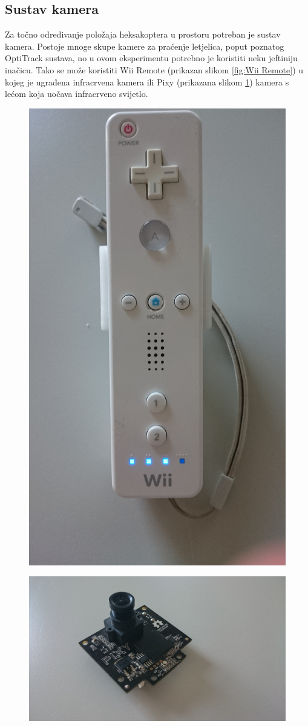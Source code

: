 \documentclass[times, utf8, diplomski]{fer}
\begin{document}
\subsection{Sustav kamera}\label{sec:kamera}
Za točno određivanje položaja heksakoptera u prostoru potreban je sustav kamera. Postoje mnoge skupe kamere za praćenje letjelica, poput poznatog OptiTrack sustava, no u ovom eksperimentu potrebno je koristiti neku jeftiniju inačicu. Tako se može koristiti Wii Remote (prikazan slikom \ref{fig:Wii Remote}) u kojeg je ugrađena infracrvena kamera ili Pixy (prikazana slikom \ref{fig:Pixy kamera}) kamera s lećom koja uočava infracrveno svijetlo. 
\begin{figure}[htb]
\centering
\begin{minipage}{.4\textwidth}
  \centering
  \includegraphics[width=.5\linewidth]{img/wiimote.JPG}
  \label{fig:Wii Remote}
\end{minipage}%
\begin{minipage}{.5\textwidth}
  \centering
  \includegraphics[width=.9\linewidth]{img/pixy.JPG}
  \label{fig:Pixy kamera}
\end{minipage}
\end{figure}
\end{document}
